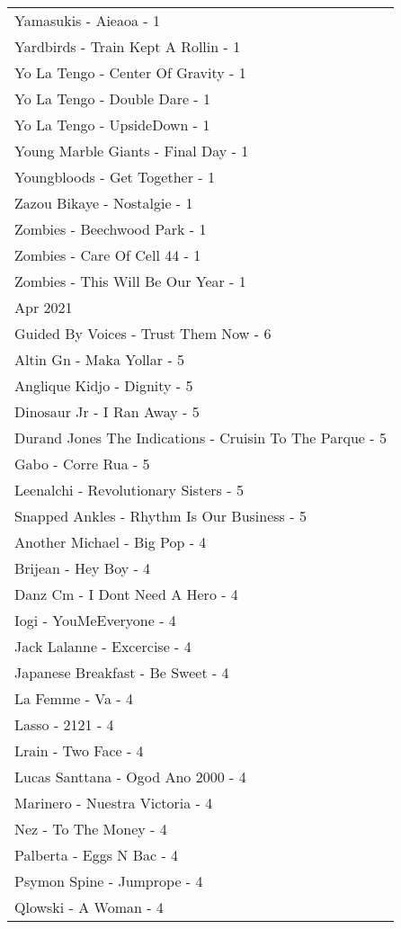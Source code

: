 \documentclass[
]{article}
\begin{document}
\begin{longtable}{l}
Yamasukis - Aieaoa - 1 \\ 
Yardbirds - Train Kept A Rollin - 1 \\ 
Yo La Tengo - Center Of Gravity - 1 \\ 
Yo La Tengo - Double Dare - 1 \\ 
Yo La Tengo - UpsideDown - 1 \\ 
Young Marble Giants - Final Day - 1 \\ 
Youngbloods - Get Together - 1 \\ 
Zazou Bikaye - Nostalgie - 1 \\ 
Zombies - Beechwood Park - 1 \\ 
Zombies - Care Of Cell 44 - 1 \\ 
Zombies - This Will Be Our Year - 1 \\ 
\midrule
\multicolumn{1}{l}{Apr 2021} \\ 
\midrule
Guided By Voices - Trust Them Now - 6 \\ 
Altin Gn - Maka Yollar - 5 \\ 
Anglique Kidjo - Dignity - 5 \\ 
Dinosaur Jr - I Ran Away - 5 \\ 
Durand Jones The Indications - Cruisin To The Parque - 5 \\ 
Gabo - Corre Rua - 5 \\ 
Leenalchi - Revolutionary Sisters - 5 \\ 
Snapped Ankles - Rhythm Is Our Business - 5 \\ 
Another Michael - Big Pop - 4 \\ 
Brijean - Hey Boy - 4 \\ 
Danz Cm - I Dont Need A Hero - 4 \\ 
Iogi - YouMeEveryone - 4 \\ 
Jack Lalanne - Excercise - 4 \\ 
Japanese Breakfast - Be Sweet - 4 \\ 
La Femme - Va - 4 \\ 
Lasso - 2121 - 4 \\ 
Lrain - Two Face - 4 \\ 
Lucas Santtana - Ogod Ano 2000 - 4 \\ 
Marinero - Nuestra Victoria - 4 \\ 
Nez - To The Money - 4 \\ 
Palberta - Eggs N Bac - 4 \\ 
Psymon Spine - Jumprope - 4 \\ 
Qlowski - A Woman - 4 \\ 

\end{longtable}
\end{document}
